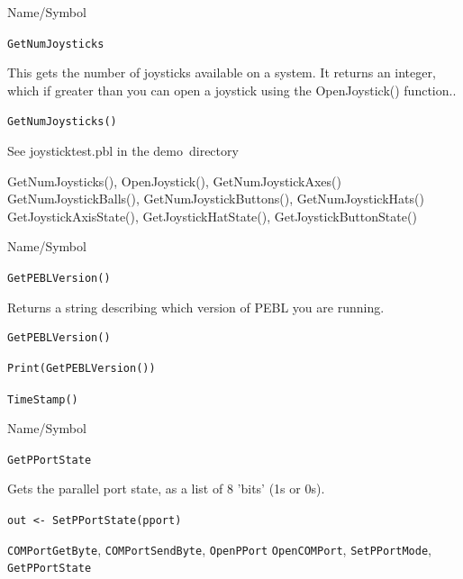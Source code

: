 \begin{desc}{Name/Symbol}
\item[Name/Symbol] \verb+GetNumJoysticks+ 

\item[Description]  
  This gets the number of joysticks available on a system. It returns an integer, which if greater than
  you can open a joystick using the OpenJoystick() function.. 
\item[Usage]          \verb+GetNumJoysticks()+ 

\item[Example]
See joysticktest.pbl in the demo\ directory

\item[See Also]
GetNumJoysticks(), OpenJoystick(), GetNumJoystickAxes()
GetNumJoystickBalls(), GetNumJoystickButtons(), GetNumJoystickHats()
GetJoystickAxisState(), GetJoystickHatState(), GetJoystickButtonState()
\end{desc} 



\begin{desc}{Name/Symbol}
\item[Name/Symbol]	\verb+GetPEBLVersion()+

\item[Description]	Returns a string describing which version of PEBL you are running.

\item[Usage]
\begin{verbatim}
GetPEBLVersion() 
\end{verbatim}

\item[Example]
\begin{verbatim}
Print(GetPEBLVersion())
\end{verbatim}

\item[See Also]	\verb+TimeStamp()+
\end{desc}



\begin{desc}{Name/Symbol}
\item[Name/Symbol] \verb+GetPPortState+ 

\item[Description]  
  Gets the parallel port state, as a list of 8 'bits' (1s or 0s).
  
\item[Usage]       
     \verb+out <- SetPPortState(pport)+ 
\item[Example]


\item[See Also]
\verb+COMPortGetByte+, \verb+COMPortSendByte+, \verb+OpenPPort+ \verb+OpenCOMPort+, \verb+SetPPortMode+, \verb+GetPPortState+ 
\end{desc} 



